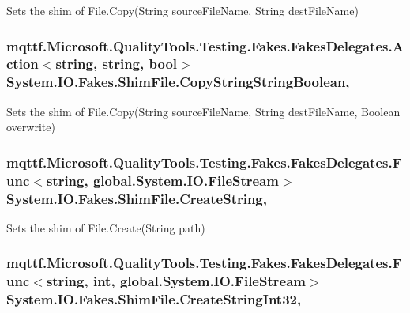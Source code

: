 Sets the shim of File.\-Copy(\-String source\-File\-Name, String dest\-File\-Name)

\hypertarget{class_system_1_1_i_o_1_1_fakes_1_1_shim_file_a2860c0f04abb0820438f504a56bd133a}{
\subsubsection[{Copy\-String\-String\-Boolean}]{\setlength{\rightskip}{0pt plus 5cm}mqttf.\-Microsoft.\-Quality\-Tools.\-Testing.\-Fakes.\-Fakes\-Delegates.\-Action$<$string, string, bool$>$ System.\-I\-O.\-Fakes.\-Shim\-File.\-Copy\-String\-String\-Boolean\hspace{0.3cm}{\ttfamily [static]}, {\ttfamily [set]}}}\label{class_system_1_1_i_o_1_1_fakes_1_1_shim_file_a2860c0f04abb0820438f504a56bd133a}


Sets the shim of File.\-Copy(\-String source\-File\-Name, String dest\-File\-Name, Boolean overwrite)

\hypertarget{class_system_1_1_i_o_1_1_fakes_1_1_shim_file_a69ed1ad3f6ab2d20da5f7eedfc023bab}{
\subsubsection[{Create\-String}]{\setlength{\rightskip}{0pt plus 5cm}mqttf.\-Microsoft.\-Quality\-Tools.\-Testing.\-Fakes.\-Fakes\-Delegates.\-Func$<$string, global.\-System.\-I\-O.\-File\-Stream$>$ System.\-I\-O.\-Fakes.\-Shim\-File.\-Create\-String\hspace{0.3cm}{\ttfamily [static]}, {\ttfamily [set]}}}\label{class_system_1_1_i_o_1_1_fakes_1_1_shim_file_a69ed1ad3f6ab2d20da5f7eedfc023bab}


Sets the shim of File.\-Create(\-String path)

\hypertarget{class_system_1_1_i_o_1_1_fakes_1_1_shim_file_a074ac0af2cbce5ef8c2ab0cf44ad8a89}{
\subsubsection[{Create\-String\-Int32}]{\setlength{\rightskip}{0pt plus 5cm}mqttf.\-Microsoft.\-Quality\-Tools.\-Testing.\-Fakes.\-Fakes\-Delegates.\-Func$<$string, int, global.\-System.\-I\-O.\-File\-Stream$>$ System.\-I\-O.\-Fakes.\-Shim\-File.\-Create\-String\-Int32\hspace{0.3cm}{\ttfamily [static]}, {\ttfamily [set]}}}\label{class_system_1_1_i_o_1_1_fakes_1_1_shim_file_a074ac0af2cbce5ef8c2ab0cf44ad8a89}


